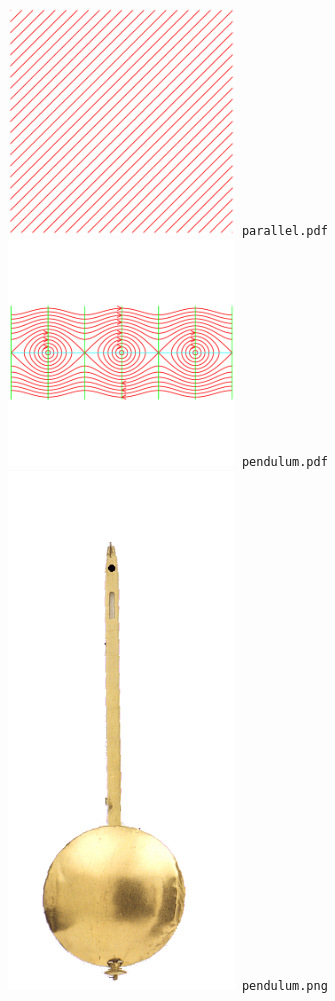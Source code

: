 \documentclass[a4paper]{amsart}
\begin{document}
\includegraphics[width=6cm]{parallel.pdf}\verb+ parallel.pdf+\\
\includegraphics[width=6cm]{pendulum.pdf}\verb+ pendulum.pdf+\\
\includegraphics[width=6cm]{pendulum.png}\verb+ pendulum.png+\\
\end{document}
